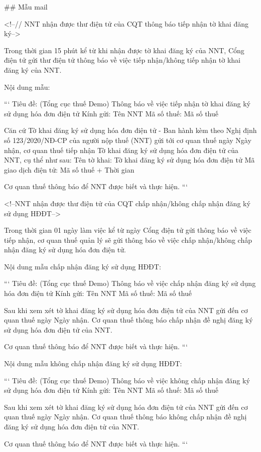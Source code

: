 
## Mẫu mail

<!--// NNT nhận được thư điện tử của CQT thông báo tiếp nhận tờ khai đăng ký-->

Trong thời gian 15 phút kể từ khi nhận được tờ khai đăng ký của NNT, Cổng điện tử gửi thư điện tử thông báo về việc tiếp nhận/không tiếp nhận tờ khai đăng ký của NNT.

Nội dung mẫu:

```
Tiêu đề: (Tổng cục thuế Demo) Thông báo về việc tiếp nhận tờ khai đăng ký sử dụng hóa đơn điện tử
Kính gửi: {{Tên NNT}}
Mã số thuế: {{Mã số thuế}}

Căn cứ Tờ khai đăng ký sử dụng hóa đơn điện tử - Ban hành kèm theo Nghị định số 123/2020/NĐ-CP của người nộp thuế (NNT) gửi tới cơ quan thuế ngày {{Ngày nhận}}, cơ quan thuế tiếp nhận Tờ khai đăng ký sử dụng hóa đơn điện tử của NNT, cụ thể như sau:
Tên tờ khai: Tờ khai đăng ký sử dụng hóa đơn điện tử
Mã giao dịch điện tử: {{Mã số thuế + Thời gian}}

Cơ quan thuế thông báo để NNT được biết và thực hiện.
```

<!--NNT nhận được thư điện tử của CQT chấp nhận/không chấp nhận đăng ký sử dụng HĐĐT-->

Trong thời gian 01 ngày làm việc kể từ ngày Cổng điện tử gửi thông báo về việc tiếp nhận, cơ quan thuế quản lý sẽ gửi thông báo về việc chấp nhận/không chấp nhận đăng ký sử dụng hóa đơn điện tử.

Nội dung mẫu chấp nhận đăng ký sử dụng HĐĐT:

```
Tiêu đề: (Tổng cục thuế Demo) Thông báo về việc chấp nhận đăng ký sử dụng hóa đơn điện tử
Kính gửi: {{Tên NNT}}
Mã số thuế: {{Mã số thuế}}

Sau khi xem xét tờ khai đăng ký sử dụng hóa đơn điện tử của NNT gửi đến cơ quan thuế ngày {{Ngày nhận}}.
Cơ quan thuế thông báo chấp nhận đề nghị đăng ký sử dụng hóa đơn điện tử của NNT.

Cơ quan thuế thông báo để NNT được biết và thực hiện.
```

Nội dung mẫu không chấp nhận đăng ký sử dụng HĐĐT:

```
Tiêu đề: (Tổng cục thuế Demo) Thông báo về việc không chấp nhận đăng ký sử dụng hóa đơn điện tử
Kính gửi: {{Tên NNT}}
Mã số thuế: {{Mã số thuế}}

Sau khi xem xét tờ khai đăng ký sử dụng hóa đơn điện tử của NNT gửi đến cơ quan thuế ngày {{Ngày nhận}}.
Cơ quan thuế thông báo không chấp nhận đề nghị đăng ký sử dụng hóa đơn điện tử của NNT.

Cơ quan thuế thông báo để NNT được biết và thực hiện.
```

